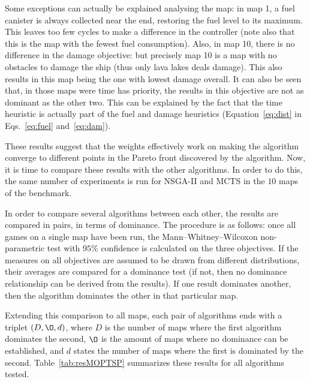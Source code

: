 \documentclass[journal]{IEEEtran}
\begin{document}
Some exceptions can actually be explained analysing the map: in map 1, a fuel canister is always collected near the end, restoring the fuel level to its maximum. This leaves too few cycles to make a difference in the controller (note also that this is the map with the fewest fuel consumption). Also, in map 10, there is no difference in the damage objective: but precisely map 10 is a map with no obstacles to damage the ship (thus only lava lakes deals damage). This also results in this map being the one with lowest damage overall. It can also be seen that, in those maps were time has priority, the results in this objective are not as dominant as the other two. This can be explained by the fact that the time heuristic is actually part of the fuel and damage heuristics (Equation~\ref{eq:dist} in Eqs.~\ref{eq:fuel} and~\ref{eq:dam}).

These results suggest that the weights effectively work on making the algorithm converge to different points in the Pareto front discovered by the algorithm. Now, it is time to compare these results with the other algorithms. In order to do this, the same number of experiments is run for NSGA-II and MCTS in the $10$ maps of the benchmark.

In order to compare several algorithms between each other, the results are compared in pairs, in terms of dominance. The procedure is as follows: once all games on a single map have been run, the Mann–Whitney–Wilcoxon non-parametric test with $95\%$ confidence is calculated on the three objectives. If the measures on all objectives are assumed to be drawn from different distributions, their averages are compared for a dominance test (if not, then no dominance relationship can be derived from the results). If one result dominates another, then the algorithm dominates the other in that particular map. 

Extending this comparison to all maps, each pair of algorithms ends with a triplet $(D, \O, d)$, where $D$ is the number of maps where the first algorithm dominates the second, $\O$ is the amount of maps where no dominance can be established, and $d$ states the number of maps where the first is dominated by the second. Table~\ref{tab:resMOPTSP} summarizes these results for all algorithms tested.
\end{document}
